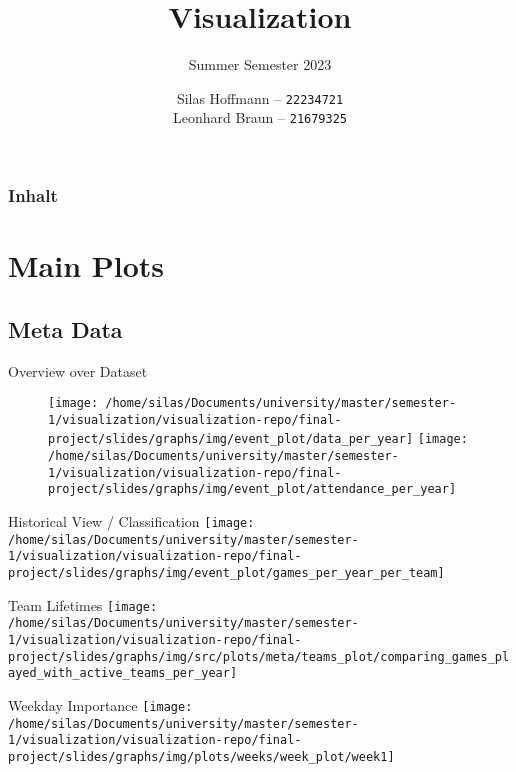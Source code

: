 \documentclass[pdf]{beamer}
\title{Visualization}
\subtitle{Summer Semester 2023}
\author{
    Silas Hoffmann --
    \texttt{22234721} \\
    Leonhard Braun --
    \texttt{21679325} \\
}
\institute{Georg-August-Universität Göttingen}
\begin{document}
    \maketitle

    \begin{frame}
        \frametitle{Inhalt}
        \tableofcontents
    \end{frame}


    \section{Main Plots}

    \subsection{Meta Data}
    \begin{frame}{Overview over Dataset}
        \begin{figure}
            \texttt{[image: /home/silas/Documents/university/master/semester-1/visualization/visualization-repo/final-project/slides/graphs/img/event\_plot/data\_per\_year]}
            \hfill
            \texttt{[image: /home/silas/Documents/university/master/semester-1/visualization/visualization-repo/final-project/slides/graphs/img/event\_plot/attendance\_per\_year]}
        \end{figure}
    \end{frame}
    \begin{frame}{Historical View / Classification}
        \centering
        \texttt{[image: /home/silas/Documents/university/master/semester-1/visualization/visualization-repo/final-project/slides/graphs/img/event\_plot/games\_per\_year\_per\_team]}
    \end{frame}
    \begin{frame}{Team Lifetimes}
        \centering
        \texttt{[image: /home/silas/Documents/university/master/semester-1/visualization/visualization-repo/final-project/slides/graphs/img/src/plots/meta/teams\_plot/comparing\_games\_played\_with\_active\_teams\_per\_year]}
    \end{frame}
    \begin{frame}{Weekday Importance}
        \centering
        \texttt{[image: /home/silas/Documents/university/master/semester-1/visualization/visualization-repo/final-project/slides/graphs/img/plots/weeks/week\_plot/week1]}
    \end{frame}
\end{document}
